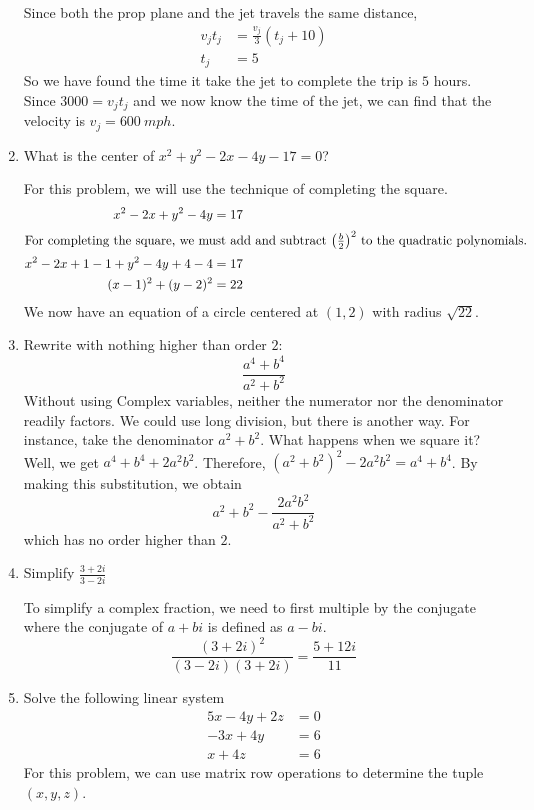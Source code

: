 \begin{enumerate}
  Since both the prop plane and the jet travels the same distance,
  \begin{align*}
    v_jt_j &= \frac{v_j}{3}(t_j + 10)\\
    t_j &= 5
  \end{align*}
  So we have found the time it take the jet to complete the trip is \(5\) hours.
  Since \(3000 = v_jt_j\) and we now know the time of the jet, we can find that
  the velocity is \(v_j = 600 \ mph\).
\item
  What is the center of \(x^2 + y^2 - 2x - 4y - 17 = 0\)?
  \par\smallskip
  For this problem, we will use the technique of completing the square.
  \begin{align*}
    x^2 - 2x + y^2 - 4y &= 17\\
    \intertext{For completing the square, we must add and subtract
    \(\big(\frac{b}{2}\big)^2\) to the quadratic polynomials.}
    x^2 - 2x + 1 - 1 + y^2 - 4y + 4 - 4 &= 17\\
    (x - 1)^2 + (y - 2)^2 &= 22
  \end{align*}
  We now have an equation of a circle centered at \((1, 2)\) with radius
  \(\sqrt{22}\).
\item
  Rewrite with nothing higher than order \(2\):
  \[
  \frac{a^4 + b^4}{a^2 + b^2}
  \]
  Without using Complex variables, neither the numerator nor the denominator
  readily factors.
  We could use long division, but there is another way.
  For instance, take the denominator \(a^2 + b^2\).
  What happens when we square it?
  Well, we get \(a^4 + b^4 + 2a^2b^2\).
  Therefore, \((a^2 + b^2)^2 - 2a^2b^2 = a^4 + b^4\).
  By making this substitution, we obtain
  \[
  a^2 + b^2 - \frac{2a^2b^2}{a^2 + b^2}
  \]
  which has no order higher than \(2\).
\item
  Simplify \(\frac{3 + 2i}{3 - 2i}\)
  \par\smallskip
  To simplify a complex fraction, we need to first multiple by the conjugate
  where the conjugate of \(a + bi\) is defined as \(a - bi\).
  \[
  \frac{(3 + 2i)^2}{(3 - 2i)(3 + 2i)} = \frac{5 + 12i}{11} 
  \]
\item
  Solve the following linear system
  \begin{align*}
    5x - 4y + 2z &= 0\\
    -3x + 4y &= 6\\
    x + 4z &= 6
  \end{align*}
  For this problem, we can use matrix row operations to determine the tuple
  \((x, y, z)\).

\end{enumerate}
